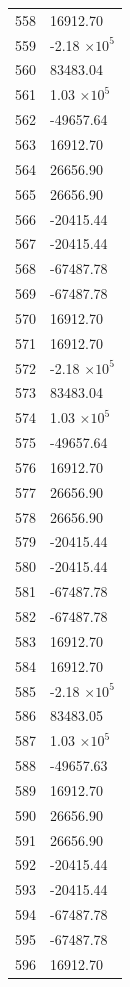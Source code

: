 \documentclass[a4paper,11pt]{article}
\begin{document}
\begin{center}
\begin{longtable}{|R{1.5cm}|R{2.5cm}|}
  558 &     16912.70 \\
  559 &        -2.18 $\times 10^{           5}$ \\
  560 &     83483.04 \\
  561 &         1.03 $\times 10^{           5}$ \\
  562 &    -49657.64 \\
  563 &     16912.70 \\
  564 &     26656.90 \\
  565 &     26656.90 \\
  566 &    -20415.44 \\
  567 &    -20415.44 \\
  568 &    -67487.78 \\
  569 &    -67487.78 \\
  570 &     16912.70 \\
  571 &     16912.70 \\
  572 &        -2.18 $\times 10^{           5}$ \\
  573 &     83483.04 \\
  574 &         1.03 $\times 10^{           5}$ \\
  575 &    -49657.64 \\
  576 &     16912.70 \\
  577 &     26656.90 \\
  578 &     26656.90 \\
  579 &    -20415.44 \\
  580 &    -20415.44 \\
  581 &    -67487.78 \\
  582 &    -67487.78 \\
  583 &     16912.70 \\
  584 &     16912.70 \\
  585 &        -2.18 $\times 10^{           5}$ \\
  586 &     83483.05 \\
  587 &         1.03 $\times 10^{           5}$ \\
  588 &    -49657.63 \\
  589 &     16912.70 \\
  590 &     26656.90 \\
  591 &     26656.90 \\
  592 &    -20415.44 \\
  593 &    -20415.44 \\
  594 &    -67487.78 \\
  595 &    -67487.78 \\
  596 &     16912.70 \\

\end{longtable}
\end{center}
\end{document}
